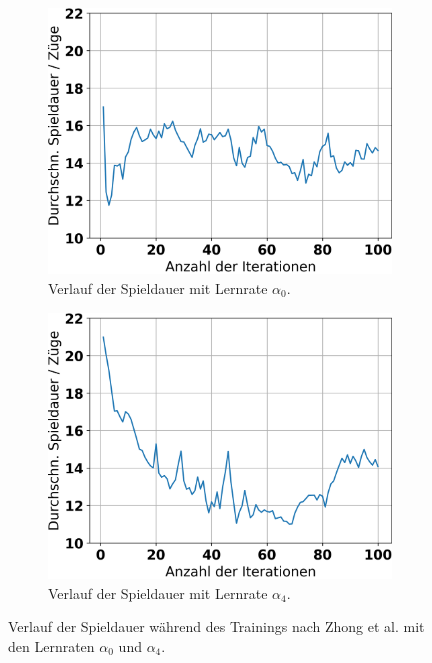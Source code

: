 \begin{figure}[ht!]%
	\begin{subfigure}[b]{0.48\textwidth}
		\includegraphics[width=\textwidth]{Bilder/ensemble-training/a_0_001/graph_game_lengths.png}
		\caption{Verlauf der Spieldauer mit Lernrate $\alpha_0$.}
		\label{fig:f11}
	\end{subfigure}
	\hfill
	\begin{subfigure}[b]{0.48\textwidth}
		\includegraphics[width=\textwidth]{Bilder/ensemble-training/e_0_00001/graph_game_lengths.png}
		\caption{Verlauf der Spieldauer mit Lernrate $\alpha_4$.}
		\label{fig:f12}
	\end{subfigure}
	\caption{Verlauf der Spieldauer während des Trainings nach Zhong et al. mit den Lernraten $\alpha_0$ und $\alpha_4$.}
\end{figure}

